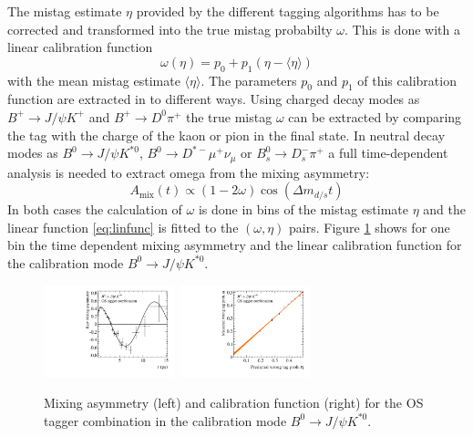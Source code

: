 \documentclass{PoS}
\begin{document}
The mistag estimate $\eta$ provided by the different tagging algorithms has to be corrected and transformed into the true mistag probabilty $\omega$. This is done with a linear calibration function
\begin{equation}
\omega(\eta)=p_0+p_1\left(\eta-\langle\eta\rangle\right)\label{eq:linfunc}
\end{equation}
with the mean mistag estimate $\langle\eta\rangle$. The parameters $p_0$ and $p_1$ of this calibration function are extracted in to different ways. Using charged decay modes as $B^+\to J\!/\!\psi K^+$ and $B^+\to D^0\pi^+$ the true mistag $\omega$ can be extracted by comparing the tag with the charge of the kaon or pion in the final state. In neutral decay modes as $B^0\to J\!/\!\psi K^{*0}$, $B^0\to D^{*-}\mu^+\nu_\mu$ or $B_s^0\to D_s^-\pi^+$ a full time-dependent analysis is needed to extract omega from the mixing asymmetry:
\begin{equation}
A_\text{mix}(t)\propto\left(1-2\omega\right)\cos\left(\Delta m_{d/s} t\right)
\end{equation}
In both cases the calculation of $\omega$ is done in bins of the mistag estimate $\eta$ and the linear function \ref{eq:linfunc} is fitted to the $(\omega,\eta)$ pairs. Figure \ref{fig:calibration} shows for one bin the time dependent mixing asymmetry and the linear calibration function for the calibration mode $B^0\to J\!/\!\psi K^{*0}$. 
\begin{figure}[htbp]
	\begin{center}
		\includegraphics[width=0.34\textwidth, angle=0]{figs/KstAsym.pdf}
		\includegraphics[width=0.34\textwidth, angle=0]{figs/Bd2JpsiKst-Kst-OST-8ScalingFunction_raw.pdf}
		\small{\caption{Mixing asymmetry (left) and calibration function (right) for the OS tagger combination in the calibration mode $B^0\to J\!/\!\psi K^{*0}$.}}
		\label{fig:calibration}
	\end{center}
\end{figure}
\end{document}
